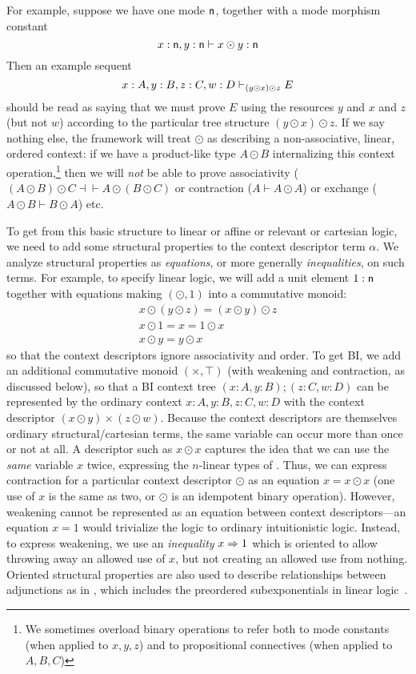 For example, suppose we have one mode $\mathsf{n}$, together with a mode
morphism constant
\[
x : \mathsf{n}, y:\mathsf{n} \vdash x \odot y : \mathsf{n}
\]
Then an example sequent
\[
x:A, y:B, z:C, w:D \vdash_{(y \odot x) \odot z} E
\]
should be read as saying that we must prove $E$ using the resources $y$
and $x$ and $z$ (but not $w$) according to the particular tree structure
${(y \odot x) \odot z}$.  If we say nothing else, the framework will
treat $\odot$ as describing a non-associative, linear, ordered context:
if we have a product-like type $A \odot B$ internalizing this context
operation,\footnote{We sometimes overload binary operations to refer
  both to mode constants (when applied to $x,y,z$) and to propositional
  connectives (when applied to $A,B,C$)} then we will \emph{not} be able
to prove associativity ($(A \odot B) \odot C \dashv\vdash A \odot (B
\odot C)$ or contraction ($A \vdash A \odot A$) or exchange ($A \odot B
\vdash B \odot A$) etc.

To get from this basic structure to linear or affine or relevant or
cartesian logic, we need to add some structural properties to the
context descriptor term $\alpha$.  We analyze structural properties as
\emph{equations}, or more generally \emph{inequalities}, on such terms.
For example, to specify linear logic, we will add a unit element $1 :
\mathsf{n}$ together with equations making $(\odot,1)$ into a commutative
monoid:
\[
\begin{array}{c}
x \odot (y \odot z) = (x \odot y) \odot z\\
x \odot 1 = x = 1 \odot x\\
x \odot y = y \odot x
\end{array}
\]
so that the context descriptors ignore associativity and order.  To get
BI, we add an additional commutative monoid $(\times,\top)$ (with
weakening and contraction, as discussed below), so that a BI context
tree $(x:A,y:B);(z:C,w:D)$ can be represented by the ordinary context
$x:A,y:B,z:C,w:D$ with the context descriptor $(x \odot y) \times (z
\odot w)$.  Because the context descriptors are themselves ordinary
structural/cartesian terms, the same variable can occur more than once
or not at all.  A descriptor such as $x \odot x$ captures the idea that
we can use the \emph{same} variable $x$ twice, expressing the $n$-linear
types of \citet{reed}.  Thus, we can express contraction for a
particular context descriptor $\odot$ as an equation $x = x \odot x$
(one use of $x$ is the same as two, or $\odot$ is an idempotent binary
operation).  However, weakening cannot be represented as an equation
between context descriptors---an equation $x = 1$ would trivialize the
logic to ordinary intuitionistic logic.  Instead, to express weakening,
we use an \emph{inequality} $x \Rightarrow 1$ which is oriented to allow
throwing away an allowed use of $x$, but not creating an allowed use
from nothing.  Oriented structural properties are also used to describe
relationships between adjunctions as in \citep{ls16adjoint}, which
includes the preordered subexponentials in linear
logic~\citep{damos,nigman}.

